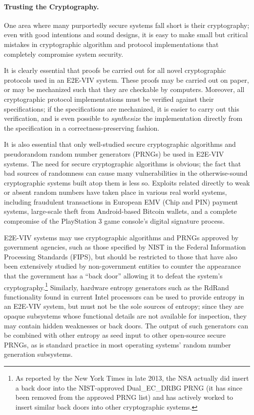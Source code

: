 \paragraph{Trusting the Cryptography.} One area where many purportedly
secure systems fall short is their cryptography; even with good
intentions and sound designs, it is easy to make small but critical
mistakes in cryptographic algorithm and protocol implementations that
completely compromise system security.

It is clearly essential that proofs be carried out for all novel
cryptographic protocols used in an E2E-VIV system. These proofs may be
carried out on paper, or may be mechanized such that they are
checkable by computers. Moreover, all cryptographic protocol
implementations must be verified against their specifications; if the
specifications are mechanized, it is easier to carry out this
verification, and is even possible to \emph{synthesize} the
implementation directly from the specification in a
correctness-preserving fashion.

It is also essential that only well-studied secure cryptographic
algorithms and pseudorandom random number generators (PRNGs) be used
in E2E-VIV systems. The need for secure cryptographic algorithms is
obvious; the fact that bad sources of randomness can cause many
vulnerabilities in the otherwise-sound cryptographic systems built
atop them is less so. Exploits related directly to weak or absent
random numbers have taken place in various real world systems,
including fraudulent transactions in European EMV (Chip and PIN)
payment systems, large-scale theft from Android-based Bitcoin wallets,
and a complete compromise of the PlayStation 3 game console's digital
signature process.

E2E-VIV systems may use cryptographic algorithms and PRNGs approved by
government agencies, such as those specified by NIST in the Federal
Information Processing Standards (FIPS), but should be restricted to
those that have also been extensively studied by non-government
entities to counter the appearance that the government has a ``back
door'' allowing it to defeat the system's cryptography.\footnote{As
  reported by the New York Times in late 2013, the NSA actually did
  insert a back door into the NIST-approved Dual\_EC\_DRBG PRNG (it
  has since been removed from the approved PRNG list) and has actively
  worked to insert similar back doors into other cryptographic
  systems.}  Similarly, hardware entropy generators such as the RdRand
functionality found in current Intel processors can be used to provide
entropy in an E2E-VIV system, but must not be the sole sources of
entropy; since they are opaque subsystems whose functional details are
not available for inspection, they may contain hidden weaknesses or
back doors. The output of such generators can be combined with other
entropy as seed input to other open-source secure PRNGs, as is
standard practice in most operating systems' random number generation
subsystems.

